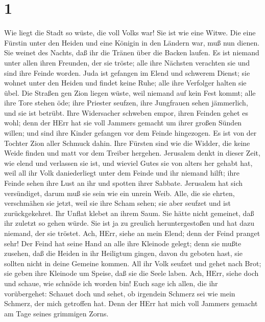 \hypertarget{section}{%
\section{1}\label{section}}

 Wie liegt die Stadt so wüste, die voll Volks war! Sie ist
wie eine Witwe. Die eine Fürstin unter den Heiden und eine Königin in
den Ländern war, muß nun dienen.  Sie weinet des Nachts, daß
ihr die Tränen über die Backen laufen. Es ist niemand unter allen ihren
Freunden, der sie tröste; alle ihre Nächsten verachten sie und sind ihre
Feinde worden.  Juda ist gefangen im Elend und schwerem
Dienst; sie wohnet unter den Heiden und findet keine Ruhe; alle ihre
Verfolger halten sie übel.  Die Straßen gen Zion liegen
wüste, weil niemand auf kein Fest kommt; alle ihre Tore stehen öde; ihre
Priester seufzen, ihre Jungfrauen sehen jämmerlich, und sie ist betrübt.
 Ihre Widersacher schweben empor, ihren Feinden gehet es
wohl; denn der HErr hat sie voll Jammers gemacht um ihrer großen Sünden
willen; und sind ihre Kinder gefangen vor dem Feinde hingezogen.
 Es ist von der Tochter Zion aller Schmuck dahin. Ihre
Fürsten sind wie die Widder, die keine Weide finden und matt vor dem
Treiber hergehen.  Jerusalem denkt in dieser Zeit, wie elend
und verlassen sie ist, und wieviel Gutes sie von alters her gehabt hat,
weil all ihr Volk daniederliegt unter dem Feinde und ihr niemand hilft;
ihre Feinde sehen ihre Lust an ihr und spotten ihrer Sabbate.
 Jerusalem hat sich versündiget, darum muß sie sein wie ein
unrein Weib. Alle, die sie ehrten, verschmähen sie jetzt, weil sie ihre
Scham sehen; sie aber seufzet und ist zurückgekehret.  Ihr
Unflat klebet an ihrem Saum. Sie hätte nicht gemeinet, daß ihr zuletzt
so gehen würde. Sie ist ja zu greulich heruntergestoßen und hat dazu
niemand, der sie tröstet. Ach, HErr, siehe an mein Elend; denn der Feind
pranget sehr!  Der Feind hat seine Hand an alle ihre
Kleinode gelegt; denn sie mußte zusehen, daß die Heiden in ihr Heiligtum
gingen, davon du geboten hast, sie sollten nicht in deine Gemeine
kommen.  All ihr Volk seufzet und gehet nach Brot; sie
geben ihre Kleinode um Speise, daß sie die Seele laben. Ach, HErr, siehe
doch und schaue, wie schnöde ich worden bin!  Euch sage ich
allen, die ihr vorübergehet: Schauet doch und sehet, ob irgendein
Schmerz sei wie mein Schmerz, der mich getroffen hat. Denn der HErr hat
mich voll Jammers gemacht am Tage seines grimmigen Zorns. 
